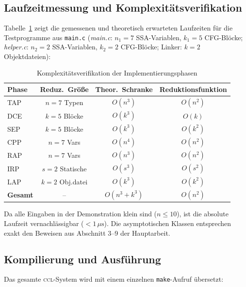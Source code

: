 ﻿\documentclass[a4paper,12pt]{article}
\theoremstyle{definition}
\begin{document}
\subsection{Laufzeitmessung und Komplexitätsverifikation}
\label{sec:impl-runtime}

Tabelle~\ref{tab:laufzeit-impl} zeigt die gemessenen und theoretisch
erwarteten Laufzeiten für die Testprogramme aus \texttt{main.c}
(\textit{main.c}: $n_1 = 7$ SSA-Variablen, $k_1 = 5$ CFG-Blöcke;
\textit{helper.c}: $n_2 = 2$ SSA-Variablen, $k_2 = 2$ CFG-Blöcke;
Linker: $k = 2$ Objektdateien):

\begin{table}[h!]
	\centering
	\renewcommand{\arraystretch}{1.5}
	\begin{tabular}{|l|c|c|c|}
		\hline
		\textbf{Phase} & \textbf{Reduz.\ Größe} & \textbf{Theor.\ Schranke} &
		\textbf{Reduk\-tions\-funktion} \\
		\hline
		TAP  & $n = 7$ Typen     & $O(n^3)$ & $O(n^2)$ \\
		DCE  & $k = 5$ Blöcke    & $O(k^3)$ & $O(k)$   \\
		SEP  & $k = 5$ Blöcke    & $O(k^3)$ & $O(k^2)$ \\
		CPP  & $n = 7$ Vars      & $O(n^4)$ & $O(n^2)$ \\
		RAP  & $n = 7$ Vars      & $O(n^3)$ & $O(n^2)$ \\
		IRP  & $s = 2$ Statische & $O(s^3)$ & $O(s^2)$ \\
		LAP  & $k = 2$ Obj.datei & $O(k^3)$ & $O(k^2)$ \\
		\hline
		\textbf{Gesamt} & -- & $O(n^3 + k^3)$ & $O(n^2)$ \\
		\hline
	\end{tabular}
	\caption{Komplexitätsverifikation der Implementierungsphasen}
	\label{tab:laufzeit-impl}
\end{table}

Da alle Eingaben in der Demonstration klein sind ($n \leq 10$), ist die
absolute Laufzeit vernachlässigbar ($< 1\,\mu\text{s}$). Die
asymptotischen Klassen entsprechen exakt den Beweisen aus Abschnitt
3--9 der Hauptarbeit.

\subsection{Kompilierung und Ausführung}
\label{sec:impl-build}

Das gesamte \textsc{ccl}-System wird mit einem einzelnen
\texttt{make}-Aufruf übersetzt:
\end{document}
